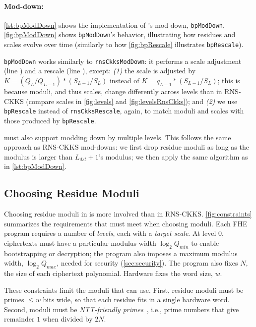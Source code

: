 

\paragraph{Mod-down:}
\autoref{lst:bpModDown} shows the implementation of \name's mod-down,
\texttt{bpModDown}. \autoref{fig:bpModDown} shows \texttt{bpModDown}'s
behavior, illustrating how residues and scales evolve over time (similarly to how
\autoref{fig:bpRescale} illustrates \texttt{bpRescale}).

\texttt{bpModDown} works similarly to \texttt{rnsCkksModDown}: it performs a scale
adjustment (line ) and a rescale (line ), except: \emph{(1)} the
scale is adjusted by $K = (Q_L/Q_{L-1}) \ast (S_{L-1}/S_L)$ instead of $K =
q_{L-1} \ast (S_{L-1}/S_L)$; this is because \name moduli, and thus scales,
change differently across levels than in RNS-CKKS (compare scales in
\autoref{fig:levels} and \autoref{fig:levelsRnsCkks});
and \emph{(2)} we use \texttt{bpRescale} instead of \texttt{rnsCkksRescale},
again, to match moduli and scales with those produced by
\texttt{bpRescale}.

\name must also support modding down by multiple levels.
This follows the same approach as RNS-CKKS mod-downs: we first drop residue
moduli as long as the modulus is larger than $L_{dst}+1$'s modulus;
we then apply the same algorithm as in
\autoref{lst:bpModDown}.

\subsection{Choosing Residue Moduli}\label{sec:modulusChain}

Choosing residue moduli in \name is more involved than in RNS-CKKS.
\autoref{fig:constraints}
summarizes the requirements that \name must meet when choosing moduli.
Each FHE program requires a number of \emph{levels}, each with a \emph{target
scale}.
At level 0, ciphertexts must have a particular modulus width $\log_2 Q_{min}$
to enable bootstrapping or decryption; the program also imposes a maximum
modulus width, $\log_2 Q_{max}$, needed for security (\autoref{sec:security}).
The program also fixes $N$, the size of each ciphertext polynomial.
Hardware fixes the word size, $w$.

These constraints limit the moduli that \name can use.
First, residue moduli must be primes $\leq w$ bits wide, so that each residue
fits in a single hardware word.
Second, moduli must be \emph{NTT-friendly primes}~\cite{lyubashevsky2013ideal},
i.e., prime numbers that give remainder $1$ when divided by $2N$.

